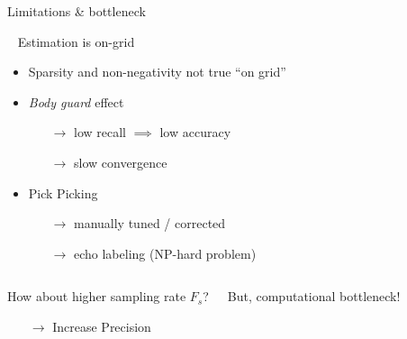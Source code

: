 \begin{frame}{Limitations \& bottleneck  \hfill\faPalette}

    \begin{block}{\faExclamationCircle~ Estimation is on-grid}

        \vspace{-2mm}
        \begin{itemize}
            \item Sparsity and non-negativity not true ``on grid''

            \item \emph{Body guard} effect \cite{duval2017sparse}
            \begin{itemize}
                \item[$\rightarrow$] low recall $\implies$ low accuracy %
                \item[$\rightarrow$] slow convergence %
            \end{itemize}
            \item Pick Picking
            \begin{itemize}
                \item[$\rightarrow$] manually tuned / corrected
                \item[$\rightarrow$] echo labeling (NP-hard problem)
            \end{itemize}
        \end{itemize}
    \end{block}

    \begin{columns}[onlytextwidth]

        \begin{block}{How about higher sampling rate $F_s$?}

            \vspace{-2mm}
            \begin{itemize}
                \item[$\rightarrow$] Increase Precision
            \end{itemize}
        \end{block}

        \begin{block}{But, computational bottleneck!}


\end{block}
\end{columns}
\end{frame}

